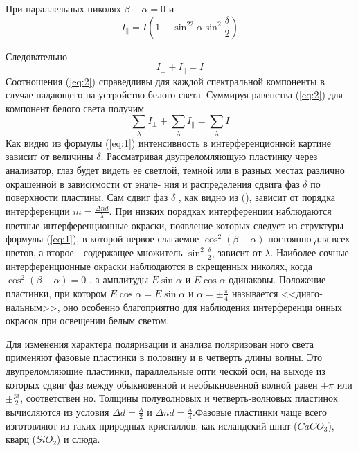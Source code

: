При параллельных николях $\beta-\alpha=0$ и 
\begin{equation}
	I_{\|}=I\left(1-\sin^22\alpha \sin^2\frac{\delta}{2}\right)
\end{equation}

Следовательно
\begin{equation}
\label{eq:2}
I_{\bot}+I_{\|}=I	
\end{equation}
Соотношения (\ref{eq:2}) справедливы для каждой спектральной компоненты в случае падающего на устройство белого света. Суммируя равенства (\ref{eq:2})
для компонент белого света получим
\begin{equation}
	\sum_{\lambda} I_{\bot}+\sum_{\lambda} I_{\|}=\sum_{\lambda} I
\end{equation}
Как видно из формулы (\ref{eq:1}) интенсивность в интерференционной
картине зависит от величины $\delta$. Рассматривая двупреломляющую
пластинку через анализатор, глаз будет видеть ее светлой, темной
или в разных местах различно окрашенной в зависимости от эначе-
ния и распределения сдвига фаз $\delta$ по поверхности пластины.
Сам сдвиг фаз $\delta$ , как видно из (), зависит от порядка интерференции
 $m=\frac{\Delta nd}{\lambda}$. При низких порядках интерферен­ции наблюдаются цветные интерференционные окраски, появление ко­торых следует из структуры формулы (\ref{eq:1}), в которой первое слага­емое $\cos^2(\beta-\alpha)$ постоянно для всех цветов, а второе -
содержащее множитель $\sin^2\frac{\delta}{2}$, зависит от $\lambda$. Наиболее сочные интерференционные окраски наблюдаются в скрещенных
николях, когда $\cos^2(\beta-\alpha)=0$ , а амплитуды $E\sin\alpha$
и $E\cos\alpha$ одинаковы. Положение пластинки, при котором
$E\cos\alpha=E\sin\alpha$ и $\alpha=\pm\frac{\pi}{4}$ называется <<диаго­
нальным>>, оно особенно благоприятно для наблюдения интерференци­
онных окрасок при освещении белым светом.

Для изменения характера поляризации и анализа поляризован­
ного света применяют фазовые пластинки в половину и в четверть
длины волны. Это двупреломляющие пластинки, параллельные опти­
ческой оси, на выходе из которых сдвиг фаз между обыкновенной и
необыкновенной волной равен $\pm\pi$ или $\pm\frac{pi}{2}$, соответствен­
но. Толщины полуволновых и четверть-волновых пластинок вычисляются из условия $\Delta d=\frac{\lambda}{2}$ и $\Delta nd=\frac{\lambda}{4}$.Фазовые
пластинки чаще всего изготовляют из таких природных кристаллов,
как исландский шпат ($CaCO_3$), кварц ($SiO_2$) и слюда.

